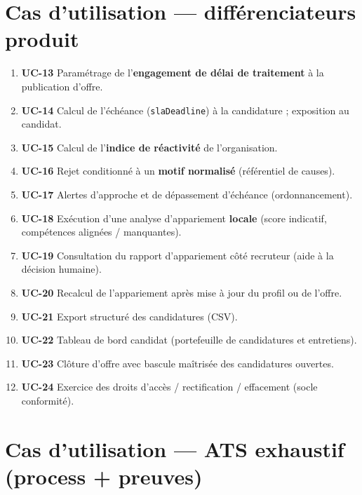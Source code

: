 \documentclass[12pt,a4paper,oneside]{report}
\begin{document}
\section{Cas d'utilisation --- différenciateurs produit}

\begin{enumerate}[leftmargin=1.3em,start=13]
  \item \textbf{UC-13} Paramétrage de l'\textbf{engagement de délai de traitement} à la publication d'offre.
  \item \textbf{UC-14} Calcul de l'échéance (\texttt{slaDeadline}) à la candidature ; exposition au candidat.
  \item \textbf{UC-15} Calcul de l'\textbf{indice de réactivité} de l'organisation.
  \item \textbf{UC-16} Rejet conditionné à un \textbf{motif normalisé} (référentiel de causes).
  \item \textbf{UC-17} Alertes d'approche et de dépassement d'échéance (ordonnancement).
  \item \textbf{UC-18} Exécution d'une analyse d'appariement \textbf{locale} (score indicatif, compétences alignées / manquantes).
  \item \textbf{UC-19} Consultation du rapport d'appariement côté recruteur (aide à la décision humaine).
  \item \textbf{UC-20} Recalcul de l'appariement après mise à jour du profil ou de l'offre.
  \item \textbf{UC-21} Export structuré des candidatures (CSV).
  \item \textbf{UC-22} Tableau de bord candidat (portefeuille de candidatures et entretiens).
  \item \textbf{UC-23} Clôture d'offre avec bascule maîtrisée des candidatures ouvertes.
  \item \textbf{UC-24} Exercice des droits d'accès / rectification / effacement (socle conformité).
\end{enumerate}

\section{Cas d'utilisation --- ATS exhaustif (process + preuves)}
\end{document}
